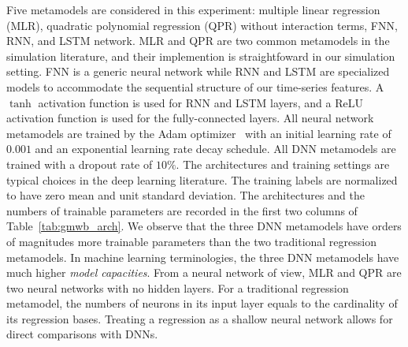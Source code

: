 Five metamodels are considered in this experiment: multiple linear regression (MLR), quadratic polynomial regression (QPR) without interaction terms, FNN, RNN, and LSTM network.
MLR and QPR are two common metamodels in the simulation literature, and their implemention is straightfoward in our simulation setting.
FNN is a generic neural network while RNN and LSTM are specialized models to accommodate the sequential structure of our time-series features.
A $\tanh$ activation function is used for RNN and LSTM layers, and a ReLU activation function is used for the fully-connected layers.
All neural network metamodels are trained by the Adam optimizer~\citep{kingma2014adam} with an initial learning rate of $0.001$ and an exponential learning rate decay schedule.
All DNN metamodels are trained with a dropout rate of $10\%$.
The architectures and training settings are typical choices in the deep learning literature.
The training labels are normalized to have zero mean and unit standard deviation.
The architectures and the numbers of trainable parameters are recorded in the first two columns of Table~\ref{tab:gmwb_arch}.
We observe that the three DNN metamodels have orders of magnitudes more trainable parameters than the two traditional regression metamodels.
In machine learning terminologies, the three DNN metamodels have much higher \textit{model capacities}.
From a neural network of view, MLR and QPR are two neural networks with no hidden layers. 
For a traditional regression metamodel, the numbers of neurons in its input layer equals to the cardinality of its regression bases.
Treating a regression as a shallow neural network allows for direct comparisons with DNNs.


